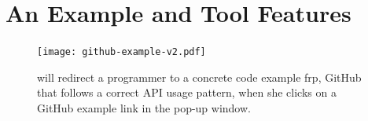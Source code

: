 \section{An Example and Tool Features}
\label{sec:motivation}
%

\begin{figure}
\centering
\texttt{[image: github-example-v2.pdf]}
  \caption{{\tool} will redirect a programmer to a concrete code example frp, GitHub that follows a correct API usage pattern, when she clicks on a GitHub example link in the pop-up window.\protect\footnotemark}
  \label{fig:github}
\end{figure}


